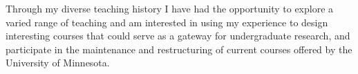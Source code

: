 \documentclass{article}[12pt]
\begin{document}
Through my diverse teaching history I have had the opportunity to explore a varied range of teaching and am interested in using my experience to design interesting courses that could serve as a gateway for undergraduate research, and participate in the maintenance and restructuring of current courses offered by the University of Minnesota.
\end{document}
